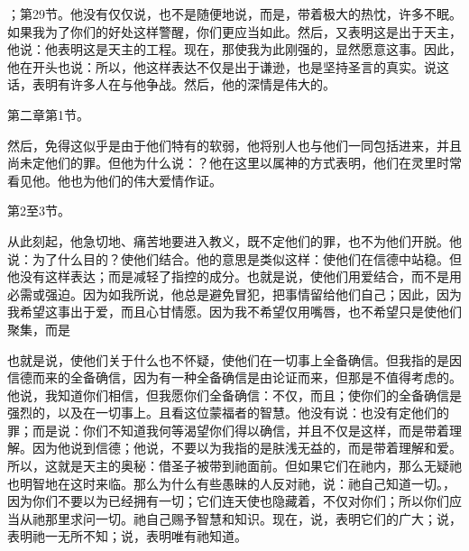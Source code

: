 ；第29节。他没有仅仅说，也不是随便地说，而是，带着极大的热忱，许多不眠。如果我为了你们的好处这样警醒，你们更应当如此。然后，又表明这是出于天主，他说：他表明这是天主的工程。现在，那使我为此刚强的，显然愿意这事。因此，他在开头也说：所以，他这样表达不仅是出于谦逊，也是坚持圣言的真实。说这话，表明有许多人在与他争战。然后，他的深情是伟大的。\par

第二章第1节。\par

然后，免得这似乎是由于他们特有的软弱，他将别人也与他们一同包括进来，并且尚未定他们的罪。但他为什么说：？他在这里以属神的方式表明，他们在灵里时常看见他。他也为他们的伟大爱情作证。\par

第2至3节。\par

从此刻起，他急切地、痛苦地要进入教义，既不定他们的罪，也不为他们开脱。他说：为了什么目的？使他们结合。他的意思是类似这样：使他们在信德中站稳。但他没有这样表达；而是减轻了指控的成分。也就是说，使他们用爱结合，而不是用必需或强迫。因为如我所说，他总是避免冒犯，把事情留给他们自己；因此，因为我希望这事出于爱，而且心甘情愿。因为我不希望仅用嘴唇，也不希望只是使他们聚集，而是\par

也就是说，使他们关于什么也不怀疑，使他们在一切事上全备确信。但我指的是因信德而来的全备确信，因为有一种全备确信是由论证而来，但那是不值得考虑的。他说，我知道你们相信，但我愿你们全备确信：不仅，而且；使你们的全备确信是强烈的，以及在一切事上。且看这位蒙福者的智慧。他没有说：也没有定他们的罪；而是说：你们不知道我何等渴望你们得以确信，并且不仅是这样，而是带着理解。因为他说到信德；他说，不要以为我指的是肤浅无益的，而是带着理解和爱。所以，这就是天主的奥秘：借圣子被带到祂面前。但如果它们在祂内，那么无疑祂也明智地在这时来临。那么为什么有些愚昧的人反对祂，说：祂自己知道一切。，因为你们不要以为已经拥有一切；它们连天使也隐藏着，不仅对你们；所以你们应当从祂那里求问一切。祂自己赐予智慧和知识。现在，说，表明它们的广大；说，表明祂一无所不知；说，表明唯有祂知道。\par

